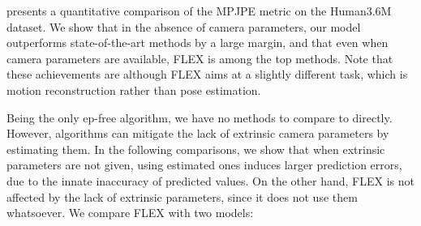 presents a quantitative comparison of the MPJPE metric on the Human3.6M~\cite{h36m_pami} dataset. 
We show that in the absence of camera parameters, our model outperforms state-of-the-art methods by a large margin, and that even when camera parameters are available, 
FLEX is among the top methods. Note that these achievements are although FLEX aims at a slightly different task, which is motion reconstruction rather than pose estimation.

Being the only ep-free algorithm, we have no methods to compare to directly. However, algorithms can mitigate the lack of extrinsic camera parameters by estimating them. In the following comparisons, we show that when extrinsic parameters are not given, using estimated ones induces larger prediction errors, due to the innate inaccuracy of predicted values. On the other hand, FLEX is not affected by the lack of extrinsic parameters, since it does not use them whatsoever.
We compare FLEX with two models:
